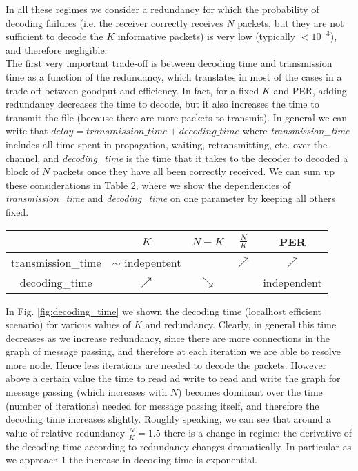In all these regimes we consider a redundancy for which the probability of decoding failures (i.e. the receiver correctly receives $N$ packets, but they are not sufficient to decode the $K$ informative packets) is very low (typically $<10^{-3}$), and therefore negligible. \\
The first very important trade-off is between decoding time and transmission time as a function of the redundancy, which translates in most of the cases in a trade-off between goodput and efficiency. In fact, for a fixed $K$ and PER, adding redundancy decreases the time to decode, but it also increases the time to transmit the file (because there are more packets to transmit). In general we can write that $delay=transmission\_time+decoding\_time$ where \emph{transmission\_time} includes all time spent in propagation, waiting, retransmitting, etc. over the channel, and \emph{decoding\_time} is the time that it takes to the decoder to decoded a block of $N$ packets once they have all been correctly received. We can sum up these considerations in Table 2, where we show the dependencies of \emph{transmission\_time} and \emph{decoding\_time} on one parameter by keeping all others fixed.
\begin{center}
\begin{tabular}{c|c|c|c|c}

\toprule
&$K$&$N-K$&$\frac{N}{K}$&PER\\
\midrule
transmission\_time&$\sim$ indepentent& & $\nearrow$&$\nearrow$\\ \hline
decoding\_time&$\nearrow$&$\searrow$&&independent\\ 
\bottomrule
\end{tabular}
\end{center}

In Fig. \ref{fig:decoding_time} we shown the decoding time (localhost efficient scenario) for various values of $K$ and redundancy. Clearly, in general this time decreases as we increase redundancy, since there are more connections in the graph of message passing, and therefore at each iteration we are able to resolve more node. Hence less iterations are needed to decode the packets. However above a certain value the time to read ad write to read and write the graph for message passing (which increases with $N$) becomes dominant over the time (number of iterations) needed for message passing itself, and therefore the decoding time increases slightly. Roughly speaking, we can see that around a value of relative redundancy $\frac{N}{K}=1.5$ there is a change in regime: the derivative of the decoding time according to redundancy changes dramatically. In particular as we approach 1 the increase in decoding time is exponential.\\

